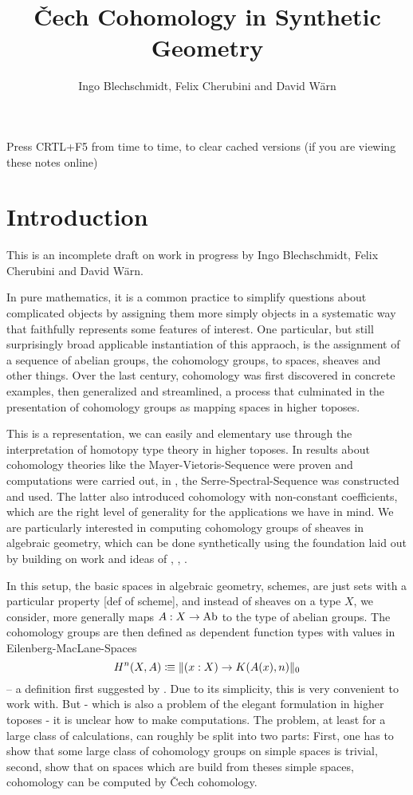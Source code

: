 \documentclass{../util/zariski}
\title{\v{C}ech Cohomology in Synthetic Geometry}
\author{Ingo Blechschmidt, Felix Cherubini and David Wärn}
\begin{document}
\maketitle

\begin{center}
  \large{Press CRTL+F5 from time to time, to clear cached versions}
  \large{(if you are viewing these notes online)}
\end{center}

\tableofcontents

\section*{Introduction}
This is an incomplete draft on work in progress by Ingo Blechschmidt, Felix Cherubini and David Wärn.

In pure mathematics,
it is a common practice to simplify questions about complicated objects
by assigning them more simply objects in a systematic way that faithfully represents some features of interest.
One particular, but still surprisingly broad applicable instantiation of this appraoch,
is the assignment of a sequence of abelian groups, the cohomology groups, to spaces, sheaves and other things.
Over the last century, cohomology was first discovered in concrete examples, then generalized and streamlined,
a process that culminated in the presentation of cohomology groups as mapping spaces in higher toposes.

This is a representation, we can easily and elementary use through the interpretation of homotopy type theory in higher toposes.
In \cite{evan} results about cohomology theories like the Mayer-Vietoris-Sequence were proven and computations were carried out,
in \cite{floris}, the Serre-Spectral-Sequence was constructed and used.
The latter also introduced cohomology with non-constant coefficients,
which are the right level of generality for the applications we have in mind.
We are particularly interested in computing cohomology groups of sheaves in algebraic geometry,
which can be done synthetically using the foundation laid out by \cite{foundations-draft}
building on work and ideas of \cite{ingo}, \cite{kock}, \cite{david-myers}.

In this setup, the basic spaces in algebraic geometry, schemes, are just sets with a particular property \cite{foundations-draft}[def of scheme],
and instead of sheaves on a type $X$, we consider, more generally maps $A:X\to\operatorname{Ab}$ to the type of abelian groups.
The cohomology groups are then defined as dependent function types with values in Eilenberg-MacLane-Spaces
\[ H^n(X,A)\vcentcolon\mspace{-1.2mu}\equiv \|(x:X)\to K(A(x),n)\|_0\]
-- a definition first suggested by \cite{mikes-blogpost}.
Due to its simplicity, this is very convenient to work with.
But - which is also a problem of the elegant formulation in higher toposes -
it is unclear how to make computations.
The problem, at least for a large class of calculations, can roughly be split into two parts:
First, one has to show that some large class of cohomology groups on simple spaces is trivial,
second, show that on spaces which are build from theses simple spaces,
cohomology can be computed by \v{C}ech cohomology.
\end{document}
